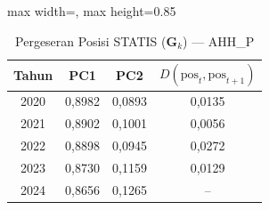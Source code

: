 \begin{table}[H]
\centering
\caption{Pergeseran Posisi STATIS ($\mathbf{G}_k$) --- AHH_P} \label{tab:app1jarak_statis_loading_ahh_p}
\begin{adjustbox}{max width=\textwidth, max height=0.85\textheight}
\begin{tabular}{|c|c|c|c|}
\hline
\textbf{Tahun} & \textbf{PC1} & \textbf{PC2} & \textbf{$D(\text{pos}_t, \text{pos}_{t+1})$} \\
\hline
2020 & 0,8982 & 0,0893 & 0,0135 \\
2021 & 0,8902 & 0,1001 & 0,0056 \\
2022 & 0,8898 & 0,0945 & 0,0272 \\
2023 & 0,8730 & 0,1159 & 0,0129 \\
2024 & 0,8656 & 0,1265 & -- \\
\hline
\end{tabular}
\end{adjustbox}
\end{table}